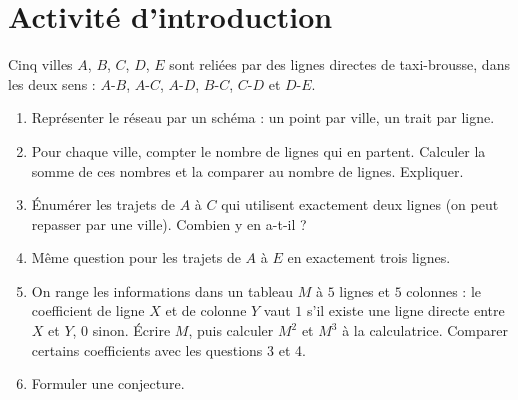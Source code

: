 \mxnewpage
\section{Activité d'introduction}
\begin{activity}
Cinq villes $A$, $B$, $C$, $D$, $E$ sont reliées par des lignes directes de taxi-brousse, dans les deux sens : $A$-$B$, $A$-$C$, $A$-$D$, $B$-$C$, $C$-$D$ et $D$-$E$.
\begin{enumerate}
\item Représenter le réseau par un schéma : un point par ville, un trait par ligne.
\item Pour chaque ville, compter le nombre de lignes qui en partent. Calculer la somme de ces nombres et la comparer au nombre de lignes. Expliquer.
\item Énumérer les trajets de $A$ à $C$ qui utilisent exactement deux lignes (on peut repasser par une ville). Combien y en a-t-il ?
\item Même question pour les trajets de $A$ à $E$ en exactement trois lignes.
\item On range les informations dans un tableau $M$ à $5$ lignes et $5$ colonnes : le coefficient de ligne $X$ et de colonne $Y$ vaut $1$ s'il existe une ligne directe entre $X$ et $Y$, $0$ sinon. Écrire $M$, puis calculer $M^2$ et $M^3$ à la calculatrice. Comparer certains coefficients avec les questions 3 et 4.
\item Formuler une conjecture.
\end{enumerate}
\end{activity}
